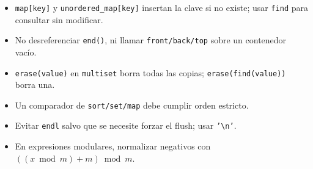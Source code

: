 \begin{itemize}
  \item \texttt{map[key]} y \texttt{unordered\_map[key]} insertan la clave si
  no existe; usar \texttt{find} para consultar sin modificar.
  \item No desreferenciar \texttt{end()}, ni llamar \texttt{front/back/top}
  sobre un contenedor vac\'io.
  \item \texttt{erase(value)} en \texttt{multiset} borra todas las copias;
  \texttt{erase(find(value))} borra una.
  \item Un comparador de \texttt{sort/set/map} debe cumplir orden estricto.
  \item Evitar \texttt{endl} salvo que se necesite forzar el flush; usar
  \texttt{'\textbackslash n'}.
  \item En expresiones modulares, normalizar negativos con
  $((x\bmod m)+m)\bmod m$.
\end{itemize}
